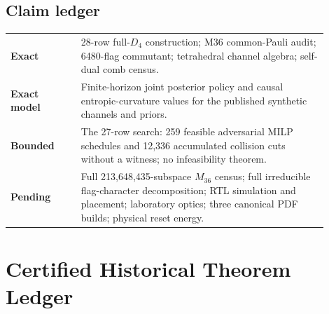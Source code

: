 \subsection*{Claim ledger}
\begin{center}
\begin{tabular}{p{0.20\linewidth}p{0.70\linewidth}}
\textbf{Exact} &
28-row full-\(D_4\) construction; M36 common-Pauli audit; 6480-flag commutant;
tetrahedral channel algebra; self-dual comb census.\\[2mm]
\textbf{Exact model} &
Finite-horizon joint posterior policy and causal entropic-curvature values for the
published synthetic channels and priors.\\[2mm]
\textbf{Bounded} &
The 27-row search: 259 feasible adversarial MILP schedules and 12,336 accumulated
collision cuts without a witness; no infeasibility theorem.\\[2mm]
\textbf{Pending} &
Full 213,648,435-subspace \(M_{36}\) census; full irreducible flag-character
decomposition; RTL simulation and placement; laboratory optics; three canonical PDF
builds; physical reset energy.\\
\end{tabular}
\end{center}

\clearpage
\section*{Certified Historical Theorem Ledger}
